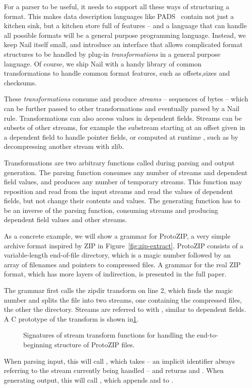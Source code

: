 For a parser to be useful, it needs to support all these ways of structuring a format. This makes data description languages like
PADS~\cite{Fisher:2005:PDL:1064978.1065046} contain not just a kitchen sink, but a kitchen store
full of features -- and a language that can handle all possible formats will be a general
purpose programming language.  Instead, we keep Nail itself small, and introduce an
interface that allows complicated format structures to be handled by  plug-in \emph{transformations} 
in a general purpose
language. Of course, we ship Nail with a handy library of common transformations to handle common
format features, such as offsets,sizes and checksums.

These \emph{transformations} consume and produce
\emph{streams} -- sequences of bytes -- which can be further passed to other transformations and
eventually parsed by a Nail rule. Transformations can also access values in dependent fields. 
Streams can be subsets of other streams, for example the substream starting at an
offset given in a dependent field to handle pointer fields, or computed at runtime
, such as by decompressing another stream with zlib.


Transformations are two arbitrary functions called during parsing and output generation.
The parsing function consumes any number of streams and dependent field values,
and produces any number of temporary streams. This function may reposition and read from the
input streams and read the values of dependent fields, but not change their contents and values. 
The generating function has to be an inverse of the parsing function, consuming streams and
producing dependent field values and other streams.



As a concrete example, we will show a grammar for ProtoZIP, a very simple archive format inspired by ZIP in
Figure~\ref{fig:zip-extract}. ProtoZIP consists of a variable-length end-of-file directory, which
is a magic number followed by an array of filenames and pointers to compressed files. A grammar for the real ZIP format, which
has more layers of indirection, is presented in the full paper. 

 The grammar first calls the zipdir transform on line 2, which finds the magic number and splits the file into
 two streams, one containing the compressed files, the other the directory.  Streams are referred to
 with , similar to dependent fields. A C prototype of the  transform is
 shown in\ref{fig:zip-transform}. 
\begin{figure}[tb]
\smaller[0.5]

\caption{Signatures of stream transform functions for handling the
end-to-beginning structure of ProtoZIP files.}
\label{fig:zip-transform}
\end{figure}
When parsing input, this will call , which takes  -- an implicit
identifier always referring to the stream currently being handled -- and returns  and
. When generating output, this will call , which appends
 and  to .


